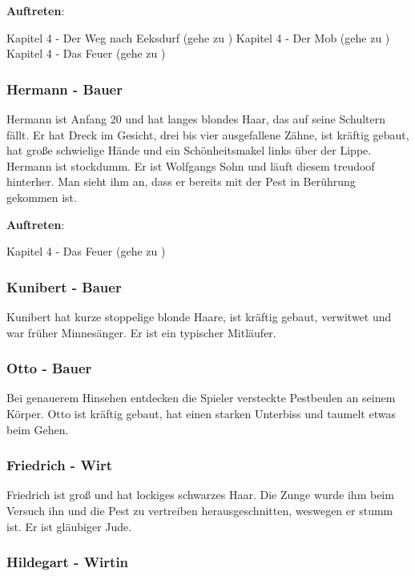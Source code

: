 \textbf{Auftreten}:

Kapitel 4 - Der Weg nach Eeksdurf (gehe zu \blue{\ref{nachxd}})
Kapitel 4 - Der Mob (gehe zu \blue{\ref{mob}})
Kapitel 4 - Das Feuer (gehe zu \blue{\ref{feuer}})

\subsubsection*{Hermann - Bauer}
\label{Hermann}

Hermann ist Anfang 20 und hat langes blondes Haar, das auf seine Schultern fällt. Er hat Dreck im Gesicht, drei bis vier ausgefallene Zähne, ist kräftig gebaut, hat große schwielige Hände und ein Schönheitsmakel links über der Lippe. Hermann ist stockdumm. Er ist Wolfgangs Sohn und läuft diesem treudoof hinterher. Man sieht ihm an, dass er bereits mit der Pest in Berührung gekommen ist.

\textbf{Auftreten}:

Kapitel 4 - Das Feuer (gehe zu \blue{\ref{feuer}})

\subsubsection*{Kunibert - Bauer}
\label{Kunibert}

Kunibert hat kurze stoppelige blonde Haare, ist kräftig gebaut, verwitwet und war früher Minnesänger. Er ist ein typischer Mitläufer.

\subsubsection*{Otto - Bauer}
\label{Otto}

Bei genauerem Hinsehen entdecken die Spieler versteckte Pestbeulen an seinem Körper. Otto ist kräftig gebaut, hat einen starken Unterbiss und taumelt etwas beim Gehen.

\subsubsection*{Friedrich - Wirt}
\label{Friedrich}

Friedrich ist groß und hat lockiges schwarzes Haar. Die Zunge wurde ihm beim Versuch ihn und die Pest zu vertreiben herausgeschnitten, weswegen er stumm ist. Er ist gläubiger Jude.

\subsubsection*{Hildegart - Wirtin}
\label{Hildegart}

